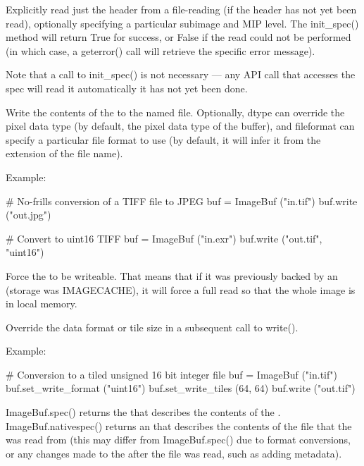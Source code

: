 Explicitly read just the header from a file-reading \ImageBuf (if the header
has not yet been read), optionally specifying a particular subimage and MIP
level. The {\cf init_spec()} method will return {\cf True} for success, or
{\cf False} if the read could not be performed (in which case, a {\cf
geterror()} call will retrieve the specific error message).

Note that a call to {\cf init_spec()} is not necessary --- any \ImageBuf API
call that accesses the spec will read it automatically it has not yet been
done.
\apiend

Write the contents of the \ImageBuf to the named file.  Optionally,
{\cf dtype} can override the pixel data type (by default, the pixel data
type of the buffer), and {\cf fileformat} can specify a particular file
format to use (by default, it will infer it from the extension of the file
name).

\noindent Example:
\begin{code}
    # No-frills conversion of a TIFF file to JPEG
    buf = ImageBuf ("in.tif")
    buf.write ("out.jpg")

    # Convert to uint16 TIFF
    buf = ImageBuf ("in.exr")
    buf.write ("out.tif", "uint16")
\end{code}
\apiend

Force the \ImageBuf to be writeable. That means that if it was previously
backed by an \ImageCache (storage was {\cf IMAGECACHE}), it will force a
full read so that the whole image is in local memory.
\apiend


Override the data format or tile size in a subsequent call to {\cf write()}.

\noindent Example:
\begin{code}
    # Conversion to a tiled unsigned 16 bit integer file
    buf = ImageBuf ("in.tif")
    buf.set_write_format ("uint16")
    buf.set_write_tiles (64, 64)
    buf.write ("out.tif")
\end{code}
\apiend

{\cf ImageBuf.spec()} returns the \ImageSpec that describes the contents of
the \ImageBuf.  {\cf ImageBuf.nativespec()} returns an \ImageSpec that
describes the contents of the file that the \ImageBuf was read from (this
may differ from {\cf ImageBuf.spec()} due to format conversions, or any
changes made to the \ImageBuf after the file was read, such as adding
metadata).

